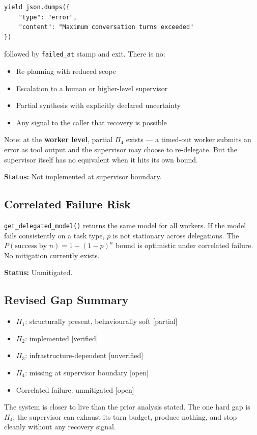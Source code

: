 \begin{verbatim}
yield json.dumps({
    "type": "error",
    "content": "Maximum conversation turns exceeded"
})
\end{verbatim}

followed by \texttt{failed\_at} stamp and exit. There is no:

\begin{itemize}
  \item Re-planning with reduced scope
  \item Escalation to a human or higher-level supervisor
  \item Partial synthesis with explicitly declared uncertainty
  \item Any signal to the caller that recovery is possible
\end{itemize}

Note: at the \textbf{worker level}, partial $\Pi_4$ exists — a timed-out worker
submits an error as tool output and the supervisor may choose to re-delegate.
But the supervisor itself has no equivalent when it hits its own bound.

\textbf{Status:} Not implemented at supervisor boundary.

\subsection*{Correlated Failure Risk}

\texttt{get\_delegated\_model()} returns the same model for all workers.
If the model fails consistently on a task type, $p$ is not stationary across
delegations. The $P(\text{success by } n) = 1 - (1-p)^n$ bound is optimistic
under correlated failure. No mitigation currently exists.

\textbf{Status:} Unmitigated.

\subsection*{Revised Gap Summary}

\begin{itemize}
  \item $\Pi_1$: structurally present, behaviourally soft [partial]
  \item $\Pi_2$: implemented [verified]
  \item $\Pi_3$: infrastructure-dependent [unverified]
  \item $\Pi_4$: missing at supervisor boundary [open]
  \item Correlated failure: unmitigated [open]
\end{itemize}

The system is closer to live than the prior analysis stated.
The one hard gap is $\Pi_4$: the supervisor can exhaust its turn budget,
produce nothing, and stop cleanly without any recovery signal.